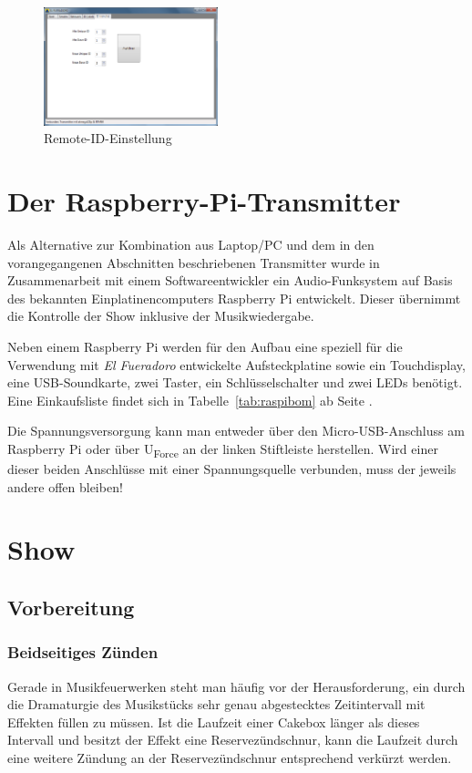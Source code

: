\documentclass[paper=a4, parskip, numbers=noenddot, toc=listof, headsepline]{scrbook}
\newcommand{\anlage}{\emph{El Fueradoro}}
\begin{document}
				\begin{figure}[!t]
					\centering
					\includegraphics[width=0.45\textwidth]{bilder/gui-remote}
					\caption{Remote-ID-Einstellung}
					\label{fig:gui-remote}
				\end{figure}

		\chapter{Der Raspberry-Pi-Transmitter}

			Als Alternative zur Kombination aus Laptop/PC und dem in den vorangegangenen Abschnitten beschriebenen Transmitter wurde in Zusammenarbeit mit einem Softwareentwickler ein Audio-Funksystem auf Basis des bekannten Einplatinencomputers Raspberry Pi entwickelt. Dieser übernimmt die Kontrolle der Show inklusive der Musikwiedergabe.

			Neben einem Raspberry Pi werden für den Aufbau eine speziell für die Verwendung mit {\anlage} entwickelte Aufsteckplatine sowie ein Touchdisplay, eine USB-Soundkarte, zwei Taster, ein Schlüsselschalter und zwei LEDs benötigt. Eine Einkaufsliste findet sich in Tabelle~\ref{tab:raspibom} ab Seite \pageref{tab:raspibom}.

			Die Spannungsversorgung kann man entweder über den Micro-USB-Anschluss am Raspberry Pi oder über U\textsubscript{Force} an der linken Stiftleiste herstellen. Wird einer dieser beiden Anschlüsse mit einer Spannungsquelle verbunden, muss der jeweils andere offen bleiben!

		\chapter{Show}

			\section{Vorbereitung}

				\subsection{Beidseitiges Zünden}
					Gerade in Musikfeuerwerken steht man häufig vor der Herausforderung, ein durch die Dramaturgie des Musikstücks sehr genau abgestecktes Zeitintervall mit Effekten füllen zu müssen. Ist die Laufzeit einer Cakebox länger als dieses Intervall und besitzt der Effekt eine Reservezündschnur, kann die Laufzeit durch eine weitere Zündung an der Reservezündschnur entsprechend verkürzt werden.
\end{document}

